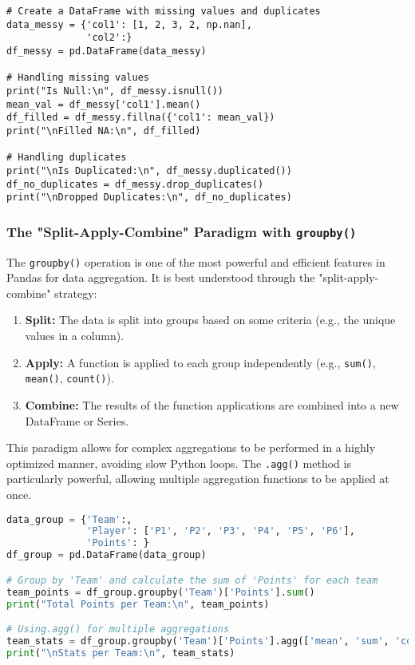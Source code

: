 \documentclass[11pt,a4paper]{article}
\begin{document}
\begin{lstlisting}
# Create a DataFrame with missing values and duplicates
data_messy = {'col1': [1, 2, 3, 2, np.nan],
              'col2':}
df_messy = pd.DataFrame(data_messy)

# Handling missing values
print("Is Null:\n", df_messy.isnull())
mean_val = df_messy['col1'].mean()
df_filled = df_messy.fillna({'col1': mean_val})
print("\nFilled NA:\n", df_filled)

# Handling duplicates
print("\nIs Duplicated:\n", df_messy.duplicated())
df_no_duplicates = df_messy.drop_duplicates()
print("\nDropped Duplicates:\n", df_no_duplicates)
\end{lstlisting}

\subsubsection{The "Split-Apply-Combine" Paradigm with \texttt{groupby()}}

The \texttt{groupby()} operation is one of the most powerful and efficient features in Pandas for data aggregation. It is best understood through the "split-apply-combine" strategy:

\begin{enumerate}
    \item \textbf{Split:} The data is split into groups based on some criteria (e.g., the unique values in a column).
    \item \textbf{Apply:} A function is applied to each group independently (e.g., \texttt{sum()}, \texttt{mean()}, \texttt{count()}).
    \item \textbf{Combine:} The results of the function applications are combined into a new DataFrame or Series.
\end{enumerate}

This paradigm allows for complex aggregations to be performed in a highly optimized manner, avoiding slow Python loops. The \texttt{.agg()} method is particularly powerful, allowing multiple aggregation functions to be applied at once.

\begin{lstlisting}[language=Python, caption=Groupby and Aggregation]
data_group = {'Team':,
              'Player': ['P1', 'P2', 'P3', 'P4', 'P5', 'P6'],
              'Points': }
df_group = pd.DataFrame(data_group)

# Group by 'Team' and calculate the sum of 'Points' for each team
team_points = df_group.groupby('Team')['Points'].sum()
print("Total Points per Team:\n", team_points)

# Using.agg() for multiple aggregations
team_stats = df_group.groupby('Team')['Points'].agg(['mean', 'sum', 'count'])
print("\nStats per Team:\n", team_stats)
\end{lstlisting}
\end{document}
